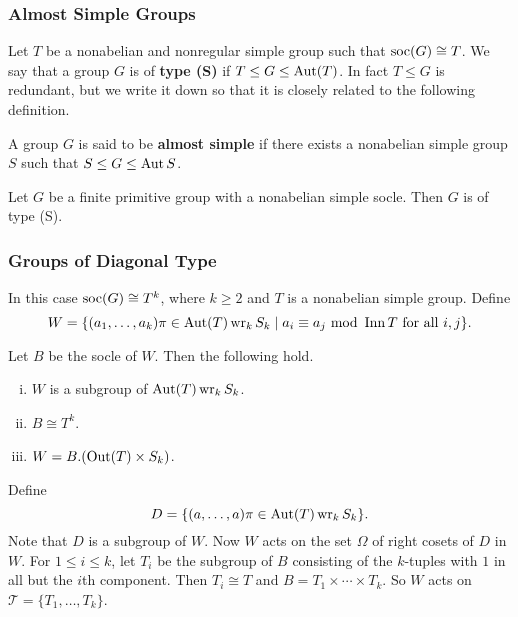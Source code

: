 \subsubsection{Almost Simple Groups} Let $T$ be a nonabelian and nonregular simple group such that $\operatorname{soc}(G) \cong T$. We say that a group $G$ is of \textbf{type (S)} if $T\leq G\leq \operatorname{Aut}(T)$. In fact $T\leq G$ is redundant, but we write it down so that it is closely related to the following definition.
\begin{definition}
	A group $G$ is said to be \textbf{almost simple} if there exists a nonabelian simple group $S$ such that $S\leq G\leq \operatorname{Aut} S$.
\end{definition}


\begin{proposition} \label{prop-type-S}
	Let $G$ be a finite primitive group with a nonabelian simple socle. Then $G$ is of type (S).
\end{proposition}






\subsubsection{Groups of Diagonal Type} \label{sec-diagonal-type} In this case $\operatorname{soc}(G)\cong T^k$, where $k\geq 2$ and $T$ is a nonabelian simple group. Define
\begin{equation*}
	W = \{(a_1,\dots, a_k)\pi\in \operatorname{Aut} (T)\operatorname{wr}_k S_k\mid a_i\equiv a_j \text{ mod } \operatorname{Inn} T \text{ for all }i,j\}.
\end{equation*}
\begin{proposition}
	Let $B$ be the socle of $W$. Then the following hold.
	\begin{enumerate}[(i)]
		\item $W$ is a subgroup of $\operatorname{Aut} (T)\operatorname{wr}_k S_k$.
		\item $B\cong T^k$.
		\item $W = B.(\operatorname{Out}(T)\times S_k)$.
	\end{enumerate}
\end{proposition}
Define
\begin{equation*}
	D = \{(a,\dots, a)\pi\in \operatorname{Aut} (T)\operatorname{wr}_k S_k\}.
\end{equation*}
Note that $D$ is a subgroup of $W$.  Now $W$ acts on the set $\Omega$ of right cosets of $D$ in $W$. For $1\leq i\leq k$, let $T_i$ be the subgroup of $B$ consisting of the $k$-tuples with $1$ in all but the $i$th component. Then $T_i\cong T$ and $B = T_1\times \cdots \times T_k$. So $W$ acts on $\mathcal{T} = \{T_1,\dots, T_k\}$. 

